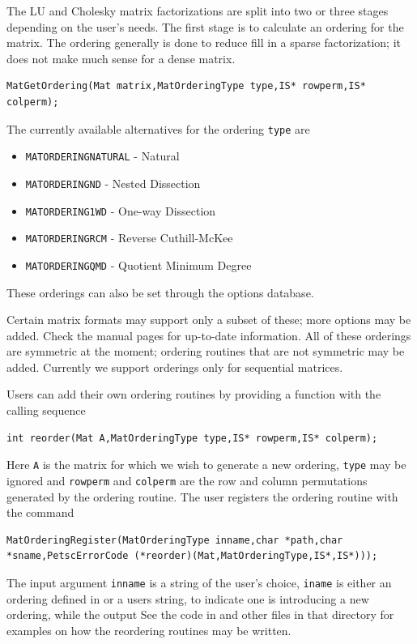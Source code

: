 {{The LU and Cholesky 
matrix factorizations are split into 
two or three stages depending on the user's needs. The first stage is
to calculate an ordering for the matrix.  The ordering generally is
done to reduce fill in a sparse factorization; it does not make much
sense for a dense matrix.  
\begin{lstlisting}
MatGetOrdering(Mat matrix,MatOrderingType type,IS* rowperm,IS* colperm);
\end{lstlisting}
The currently available alternatives for the ordering \lstinline{type} are
\begin{itemize}
\item \lstinline{MATORDERINGNATURAL} - Natural
\item \lstinline{MATORDERINGND} - Nested Dissection
\item \lstinline{MATORDERING1WD} - One-way Dissection
\item \lstinline{MATORDERINGRCM} - Reverse Cuthill-McKee
\item \lstinline{MATORDERINGQMD} - Quotient Minimum Degree
\end{itemize}
These orderings can also be set through the options database.

Certain matrix formats may support only a subset of these; more options may
be added. Check the manual pages for up-to-date information. All of these orderings are
symmetric at the moment; ordering routines that are
not symmetric may be added. Currently we support orderings only for
sequential matrices.

Users can add their own ordering routines
by providing a function with the calling sequence
\begin{lstlisting}
int reorder(Mat A,MatOrderingType type,IS* rowperm,IS* colperm);
\end{lstlisting}
Here \lstinline{A} is the matrix for which we wish to generate a new ordering,
\lstinline{type} may be ignored and \lstinline{rowperm} and \lstinline{colperm} are the row
and column permutations generated by the ordering routine.
The user registers the ordering routine
with the command
\begin{lstlisting}
MatOrderingRegister(MatOrderingType inname,char *path,char *sname,PetscErrorCode (*reorder)(Mat,MatOrderingType,IS*,IS*)));
\end{lstlisting}
The  
input argument \lstinline{inname} is a string of the user's choice, \lstinline{iname} is either
an ordering defined in  or a users string,
to indicate one is introducing a new ordering, while the output
See the code in  and other files in that
directory for examples on how the reordering routines may be written.

}}
